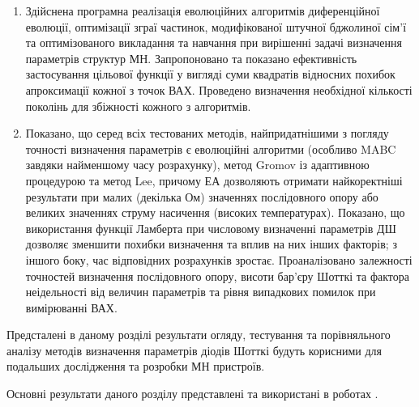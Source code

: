 \begin{enumerate}[leftmargin=0cm,itemindent=3em]
    \item Здійснена програмна реалізація еволюційних алгоритмів  диференційної еволюції, оптимізації зграї частинок,
модифікованої штучної бджолиної сім'ї та оптимізованого викладання та навчання при вирішенні задачі визначення параметрів структур МН.
Запропоновано та показано ефективність застосування цільової функції у вигляді суми квадратів відносних похибок апроксимації кожної з точок ВАХ.
Проведено визначення необхідної кількості поколінь для збіжності кожного з алгоритмів.

   \item Показано, що серед всіх тестованих методів, найпридатнішими з погляду точності визначення параметрів є еволюційні алгоритми (особливо MABC завдяки найменшому часу розрахунку), метод Gromov із адаптивною процедурою та метод Lee, причому ЕА дозволяють отримати найкоректніші результати при малих (декілька Ом) значеннях послідовного опору або великих значеннях струму насичення (високих температурах).
    Показано, що використання функції Ламберта при числовому визначенні параметрів ДШ дозволяє зменшити похибки визначення та вплив на них інших факторів; з іншого боку, час відповідних розрахунків зростає.
    Проаналізовано залежності точностей визначення послідовного опору, висоти бар'єру Шотткі та фактора неідельності від величин параметрів та рівня випадкових помилок при вимірюванні ВАХ.

  \end{enumerate}

Предсталені в даному розділі результати огляду, тестування та порівняльного аналізу методів визначення параметрів діодів Шотткі будуть корисними для подальших дослідження та розробки
МН пристроїв.

Основні результати даного розділу представлені та використані в роботах \cite{Olikh:Rev,6CPFCS,OlikhJAP,Olikh:Ultras2016,Olikh2016JSem}.
